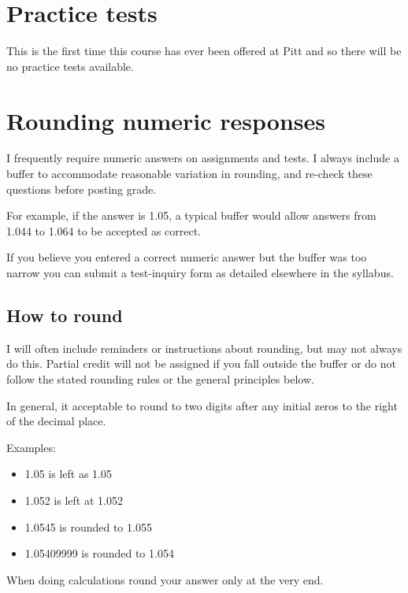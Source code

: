 \documentclass[
]{book}
\providecommand{\tightlist}{%
  \setlength{\itemsep}{0pt}\setlength{\parskip}{0pt}}
\begin{document}
\hypertarget{practice-tests}{%
\chapter{Practice tests}\label{practice-tests}}

This is the first time this course has ever been offered at Pitt and so there will be no practice tests available.

\hypertarget{rounding-numeric-responses}{%
\chapter{Rounding numeric responses}\label{rounding-numeric-responses}}

I frequently require numeric answers on assignments and tests. I always include a buffer to accommodate reasonable variation in rounding, and re-check these questions before posting grade.

For example, if the answer is 1.05, a typical buffer would allow answers from 1.044 to 1.064 to be accepted as correct.

If you believe you entered a correct numeric answer but the buffer was too narrow you can submit a test-inquiry form as detailed elsewhere in the syllabus.

\hypertarget{how-to-round}{%
\section{How to round}\label{how-to-round}}

I will often include reminders or instructions about rounding, but may not always do this. Partial credit will not be assigned if you fall outside the buffer or do not follow the stated rounding rules or the general principles below.

In general, it acceptable to round to two digits after any initial zeros to the right of the decimal place.

Examples:

\begin{itemize}
\tightlist
\item
  1.05 is left as 1.05
\item
  1.052 is left at 1.052
\item
  1.0545 is rounded to 1.055
\item
  1.05409999 is rounded to 1.054
\end{itemize}

When doing calculations round your answer only at the very end.
\end{document}
